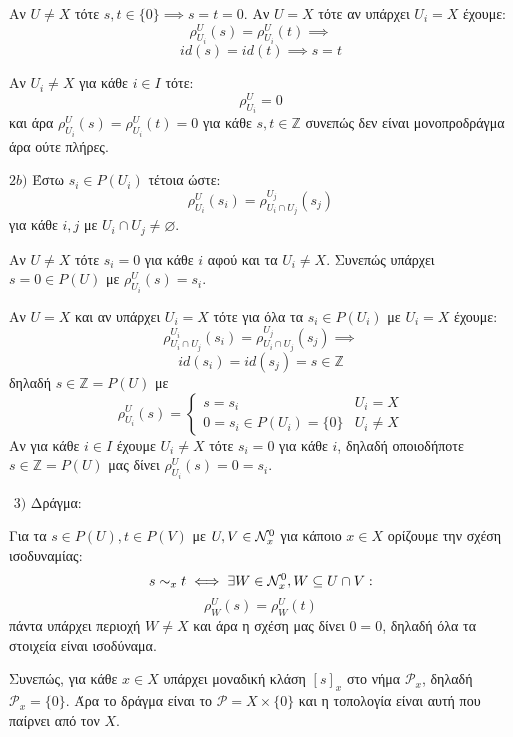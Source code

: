 Αν $U\neq X$ τότε $s,t \in \{0\} \implies s=t=0$. Αν $U=X$ τότε αν υπάρχει $U_i = X$ έχουμε:
$$\rho^U_{U_i}(s) = \rho^U_{U_i}(t) \implies$$
$$id(s) = id(t) \implies s=t$$

Αν $U_i \neq X$ για κάθε $i \in I$ τότε:
$$\rho^U_{U_i} = 0$$ και άρα $\rho^U_{U_i}(s) = \rho^U_{U_i}(t) = 0$ για κάθε $s,t \in \mathbb{Z}$ συνεπώς δεν είναι μονοπροδράγμα άρα ούτε πλήρες.

$2b)$ Έστω $s_i \in P(U_i)$ τέτοια ώστε:
$$\rho^U_{U_i} (s_i) = \rho^{U_j}_{U_i\cap U_j}(s_j)$$ για κάθε $i,j$ με $U_i\cap U_j \neq \varnothing$.

Αν $U\neq X$ τότε $s_i = 0$ για κάθε $i$ αφού και τα $U_i \neq X$. Συνεπώς υπάρχει $s = 0 \in P(U)$ με $\rho^U_{U_i}(s) = s_i$.

Αν $U = X$ και αν υπάρχει $U_i = X$ τότε για όλα τα $s_i \in P(U_i)$ με $U_i = X$ έχουμε:
$$\rho^{U_i}_{U_i \cap U_j} (s_i) = \rho^{U_j}_{U_i\cap U_j}(s_j) \implies $$
$$id(s_i) = id(s_j) = s \in \mathbb{Z}$$ δηλαδή $s \in \mathbb{Z} = P(U)$ με 
$$\rho^U_{U_i}(s) = \begin{cases}
    s = s_i & U_i = X \\
    0 = s_i \in P(U_i) = \{0\} & U_i \neq X
\end{cases}$$ Αν για κάθε $i \in I$ έχουμε $U_i\neq X$ τότε $s_i = 0$ για κάθε $i$, δηλαδή οποιοδήποτε $s \in \mathbb{Z} = P(U)$ μας δίνει $\rho^U_{U_i}(s) = 0 = s_i$.

$ $\newline
$3)$ Δράγμα:

Για τα $s\in P(U), t \in P(V)$ με $U,V\in\mathcal{N}^0_x$ για κάποιο $x \in X$ ορίζουμε την σχέση ισοδυναμίας:
$$s \sim_x t \iff \exists W \in \mathcal{N}^0_x, W \subseteq U\cap V:$$
$$\rho^U_W(s) = \rho^U_W(t)$$ πάντα υπάρχει περιοχή $W \neq X$ και άρα η σχέση μας δίνει $0=0$, δηλαδή όλα τα στοιχεία είναι ισοδύναμα.

Συνεπώς, για κάθε $x \in X$ υπάρχει μοναδική κλάση $[s]_x$ στο νήμα $\mathcal{P}_x$, δηλαδή $\mathcal{P}_x = \{0\}$. Άρα το δράγμα είναι το $\mathcal{P}=X\times \{0\}$ και η τοπολογία είναι αυτή που παίρνει από τον $X$.



